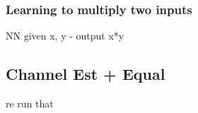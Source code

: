 \subsubsection{Learning to multiply two inputs}
\item NN given x, y - output x*y

\subsection{Channel Est + Equal}
\item re run that 